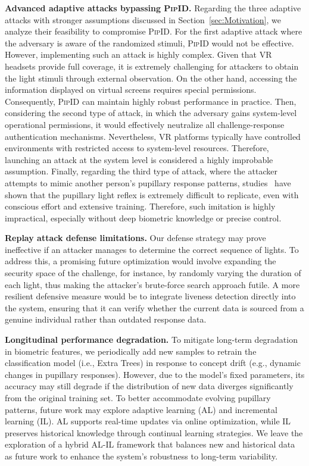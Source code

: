 \documentclass[sigconf]{acmart}
\newcommand{\sysname}{\textsc{PipID}\xspace}
\begin{document}
\noindent \textbf{Advanced adaptive attacks bypassing \sysname.}
Regarding the three adaptive attacks with stronger assumptions discussed in Section~\ref{sec:Motivation}, we analyze their feasibility to compromise \sysname.
For the first adaptive attack where the adversary is aware of the randomized stimuli, \sysname would not be effective. However, implementing such an attack is highly complex. Given that VR headsets provide full coverage, it is extremely challenging for attackers to obtain the light stimuli through external observation. On the other hand, accessing the information displayed on virtual screens requires special permissions. Consequently, \sysname can maintain highly robust performance in practice. Then, considering the second type of attack, in which the adversary gains system-level operational permissions, it would effectively neutralize all challenge-response authentication mechanisms. Nevertheless, VR platforms typically have controlled environments with restricted access to system-level resources. Therefore, launching an attack at the system level is considered a highly improbable assumption.
Finally, regarding the third type of attack, where the attacker attempts to mimic another person's pupillary response patterns, studies~\cite{Niehorster2022} have shown that the pupillary light reflex is extremely difficult to replicate, even with conscious effort and extensive training. Therefore, such imitation is highly impractical, especially without deep biometric knowledge or precise control.


\noindent \textbf{Replay attack defense limitations.}
Our defense strategy may prove ineffective if an attacker manages to determine the correct sequence of lights. To address this, a promising future optimization would involve expanding the security space of the challenge, for instance, by randomly varying the duration of each light, thus making the attacker's brute-force search approach futile. A more resilient defensive measure would be to integrate liveness detection directly into the system, ensuring that it can verify whether the current data is sourced from a genuine individual rather than outdated response data.

\noindent \textbf{Longitudinal performance degradation.}
To mitigate long-term degradation in biometric features, we periodically add new samples to retrain the classification model (i.e., Extra Trees) in response to concept drift (e.g., dynamic changes in pupillary responses). However, due to the model's fixed parameters, its accuracy may still degrade if the distribution of new data diverges significantly from the original training set. To better accommodate evolving pupillary patterns, future work may explore adaptive learning (AL) and incremental learning (IL). AL supports real-time updates via online optimization, while IL preserves historical knowledge through continual learning strategies. We leave the exploration of a hybrid AL-IL framework that balances new and historical data as future work to enhance the system’s robustness to long-term variability.
\end{document}
